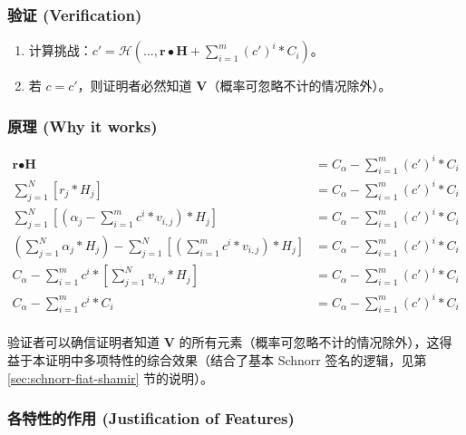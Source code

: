 \subsubsection*{验证 (Verification)}

\begin{enumerate}
	\item 计算挑战：\(c' = \mathcal{H}(...,\textbf{r} \bullet \textbf{H} + \sum^{m}_{i=1} (c')^i*C_i)\)。
	\item 若 $c = c'$，则证明者必然知道 $\boldsymbol{V}$（概率可忽略不计的情况除外）。
\end{enumerate}

\subsubsection*{原理 (Why it works)}

\begin{align*}
\textbf{r} \bullet \textbf{H} &= C_{\alpha} - \sum^{m}_{i=1} (c')^i*C_i \\
\sum^{N}_{j=1} [r_j*H_j] &= C_{\alpha} - \sum^{m}_{i=1} (c')^i*C_i \\
\sum^{N}_{j=1} [(\alpha_j - \sum^{m}_{i=1} c^i*v_{i,j})*H_j] &= C_{\alpha} - \sum^{m}_{i=1} (c')^i*C_i \\
(\sum^{N}_{j=1} \alpha_j*H_j) - \sum^{N}_{j=1} [(\sum^{m}_{i=1} c^i*v_{i,j})*H_j] &= C_{\alpha} - \sum^{m}_{i=1} (c')^i*C_i \\
C_{\alpha} - \sum^{m}_{i=1} c^i*[\sum^{N}_{j=1} v_{i,j}*H_j] &= C_{\alpha} - \sum^{m}_{i=1} (c')^i*C_i \\
C_{\alpha} - \sum^{m}_{i=1} c^i*C_i &= C_{\alpha} - \sum^{m}_{i=1} (c')^i*C_i \\
\end{align*}

验证者可以确信证明者知道 $\boldsymbol{V}$ 的所有元素（概率可忽略不计的情况除外），这得益于本证明中多项特性的综合效果（结合了基本 Schnorr 签名的逻辑，见第 \ref{sec:schnorr-fiat-shamir} 节的说明）。

\subsubsection*{各特性的作用 (Justification of Features)}

